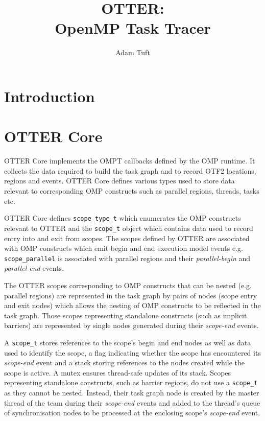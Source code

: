 \documentclass[11pt,a4paper]{article}
\title{OTTER:\\OpenMP Task Tracer}
\newcommand{\code}[1]{\texttt{#1} }
\begin{document}
\author{Adam Tuft}
\maketitle

\section{Introduction}

\section{OTTER Core}

OTTER Core implements the OMPT callbacks defined by the OMP runtime. It collects the data required to build the task graph and to record OTF2 locations, regions and events. OTTER Core defines various types used to store data relevant to corresponding OMP constructs such as parallel regions, threads, tasks etc.

OTTER Core defines \code{scope\_type\_t} which enumerates the OMP constructs relevant to OTTER and the \code{scope\_t} object which contains data used to record entry into and exit from scopes. The scopes defined by OTTER are associated with OMP constructs which emit begin and end execution model events e.g. \code{scope\_parallel} is associated with parallel regions and their \emph{parallel-begin} and \emph{parallel-end} events.

The OTTER scopes corresponding to OMP constructs that can be nested (e.g. parallel regions) are represented in the task graph by pairs of nodes (scope entry and exit nodes) which allows the nesting of OMP constructs to be reflected in the task graph. Those scopes representing standalone constructs (such as implicit barriers) are represented by single nodes generated during their \emph{scope-end} events.

A \code{scope\_t} stores references to the scope's begin and end nodes as well as data used to identify the scope, a flag indicating whether the scope has encountered its \emph{scope-end} event and a stack storing references to the nodes created while the scope is active. A mutex ensures thread-safe updates of its stack. Scopes representing standalone constructs, such as barrier regions, do not use a \code{scope\_t} as they cannot be nested. Instead, their task graph node is created by the master thread of the team during their \emph{scope-end} events and added to the thread's queue of synchronisation nodes to be processed at the enclosing scope's \emph{scope-end} event.
\end{document}
